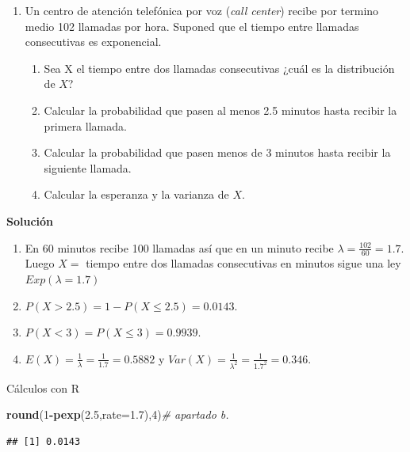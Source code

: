 \documentclass[
]{article}
\newenvironment{Shaded}{\begin{snugshade}}{\end{snugshade}}
\newcommand{\CommentTok}[1]{\textcolor[rgb]{0.56,0.35,0.01}{\textit{#1}}}
\newcommand{\DataTypeTok}[1]{\textcolor[rgb]{0.13,0.29,0.53}{#1}}
\newcommand{\DecValTok}[1]{\textcolor[rgb]{0.00,0.00,0.81}{#1}}
\newcommand{\FloatTok}[1]{\textcolor[rgb]{0.00,0.00,0.81}{#1}}
\newcommand{\KeywordTok}[1]{\textcolor[rgb]{0.13,0.29,0.53}{\textbf{#1}}}
\newcommand{\NormalTok}[1]{#1}
\newcommand{\OperatorTok}[1]{\textcolor[rgb]{0.81,0.36,0.00}{\textbf{#1}}}
\providecommand{\tightlist}{%
  \setlength{\itemsep}{0pt}\setlength{\parskip}{0pt}}
\begin{document}
\begin{enumerate}
\def\labelenumi{\arabic{enumi}.}
\setcounter{enumi}{2}
\tightlist
\item
  Un centro de atención telefónica por voz (\emph{call center}) recibe
  por termino medio 102 llamadas por hora. Suponed que el tiempo entre
  llamadas consecutivas es exponencial.

  \begin{enumerate}
  \def\labelenumii{\alph{enumii}.}
  \tightlist
  \item
    Sea X el tiempo entre dos llamadas consecutivas ¿cuál es la
    distribución de \(X\)?
  \item
    Calcular la probabilidad que pasen al menos 2.5 minutos hasta
    recibir la primera llamada.
  \item
    Calcular la probabilidad que pasen menos de 3 minutos hasta recibir
    la siguiente llamada.
  \item
    Calcular la esperanza y la varianza de \(X\).
  \end{enumerate}
\end{enumerate}

\textbf{Solución}

\begin{enumerate}
\def\labelenumi{\alph{enumi}.}
\item
  En 60 minutos recibe 100 llamadas así que en un minuto recibe
  \(\lambda=\frac{102}{60}=1.7\). Luego \(X=\) tiempo entre dos llamadas
  consecutivas en minutos sigue una ley \(Exp(\lambda=1.7)\)
\item
  \(P(X>2.5)=1-P(X\leq 2.5)=0.0143.\)
\item
  \(P(X<3)=P(X\leq 3)=0.9939.\)
\item
  \(E(X)=\frac{1}{\lambda}=\frac{1}{1.7}=0.5882\) y
  \(Var(X)=\frac{1}{\lambda^2}=\frac{1}{1.7^2}=0.346.\)
\end{enumerate}

Cálculos con R

\begin{Shaded}
\begin{Highlighting}[]
\KeywordTok{round}\NormalTok{(}\DecValTok{1}\OperatorTok{{-}}\KeywordTok{pexp}\NormalTok{(}\FloatTok{2.5}\NormalTok{,}\DataTypeTok{rate=}\FloatTok{1.7}\NormalTok{),}\DecValTok{4}\NormalTok{)}\CommentTok{\# apartado b.}
\end{Highlighting}
\end{Shaded}

\begin{verbatim}
## [1] 0.0143
\end{verbatim}
\end{document}

